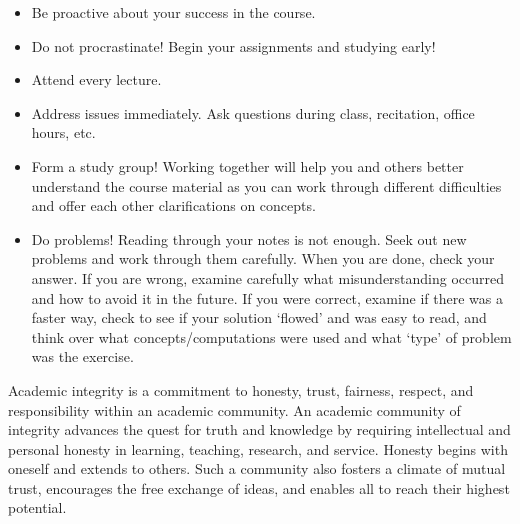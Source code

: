 \documentclass[11pt,letterpaper]{article}
\begin{document}
\begin{itemize} \itemsep=0.3ex
\item Be proactive about your success in the course.
\item Do not procrastinate! Begin your assignments and studying early!
\item Attend every lecture.
\item Address issues immediately. Ask questions during class, recitation, office hours, etc. 
\item Form a study group! Working together will help you and others better understand the course material as you can work through different difficulties and offer each other clarifications on concepts.
\item Do problems! Reading through your notes is not enough. Seek out new problems and work through them carefully. When you are done, check your answer. If you are wrong, examine carefully what misunderstanding occurred and how to avoid it in the future. If you were correct, examine if there was a faster way, check to see if your solution `flowed' and was easy to read, and think over what concepts/computations were used and what `type' of problem was the exercise.
\end{itemize}
\sectionbreak











Academic integrity is a commitment to honesty, trust, fairness, respect, and responsibility within an academic community. An academic community of integrity advances the quest for truth and knowledge by requiring intellectual and personal honesty in learning, teaching, research, and service. Honesty begins with oneself and extends to others. Such a community also fosters a climate of mutual trust, encourages the free exchange of ideas, and enables all to reach their highest potential. \pspace
\end{document}
